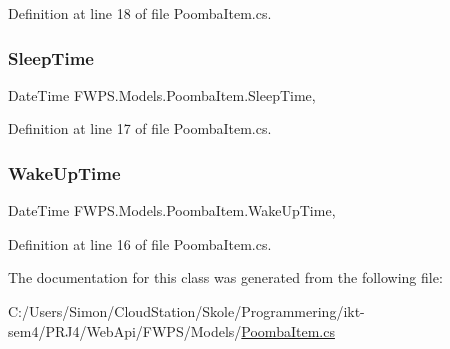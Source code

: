 Definition at line 18 of file Poomba\+Item.\+cs.

\mbox{\label{class_f_w_p_s_1_1_models_1_1_poomba_item_adbf2f8b487450c2949cd3f3093841b2c}} 
\subsubsection{\texorpdfstring{Sleep\+Time}{SleepTime}}
{\footnotesize\ttfamily Date\+Time F\+W\+P\+S.\+Models.\+Poomba\+Item.\+Sleep\+Time\hspace{0.3cm}{\ttfamily [get]}, {\ttfamily [set]}}



Definition at line 17 of file Poomba\+Item.\+cs.

\mbox{\label{class_f_w_p_s_1_1_models_1_1_poomba_item_a59508eafd422e3a407038e32b0bd73e9}} 
\subsubsection{\texorpdfstring{Wake\+Up\+Time}{WakeUpTime}}
{\footnotesize\ttfamily Date\+Time F\+W\+P\+S.\+Models.\+Poomba\+Item.\+Wake\+Up\+Time\hspace{0.3cm}{\ttfamily [get]}, {\ttfamily [set]}}



Definition at line 16 of file Poomba\+Item.\+cs.



The documentation for this class was generated from the following file\+:\begin{DoxyCompactItemize}
\item 
C\+:/\+Users/\+Simon/\+Cloud\+Station/\+Skole/\+Programmering/ikt-\/sem4/\+P\+R\+J4/\+Web\+Api/\+F\+W\+P\+S/\+Models/\mbox{\hyperlink{_web_api_2_f_w_p_s_2_models_2_poomba_item_8cs}{Poomba\+Item.\+cs}}\end{DoxyCompactItemize}
